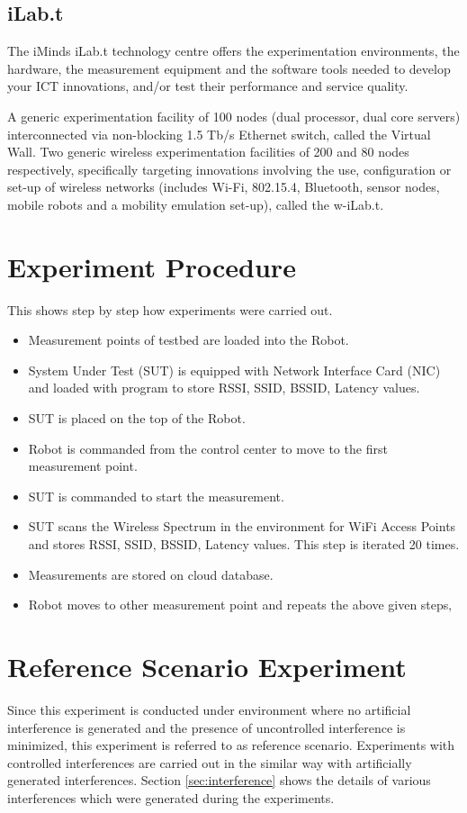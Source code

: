 \documentclass[11pt,a4paper,headinclude,footinclude,chapterprefix=on]{scrreprt}
\begin{document}
\subsection{iLab.t}
The iMinds iLab.t technology centre offers the experimentation environments, the hardware, the measurement equipment and the software tools needed to develop your ICT innovations, and/or test their performance and service quality.

A generic experimentation facility of 100 nodes (dual processor, dual core servers) interconnected via non-blocking 1.5 Tb/s Ethernet switch, called the Virtual Wall. Two generic wireless experimentation facilities of 200 and 80 nodes respectively, specifically targeting innovations involving the use, configuration or set-up of wireless networks (includes Wi-Fi, 802.15.4, Bluetooth, sensor nodes, mobile robots and a mobility emulation set-up), called the w-iLab.t.

\section{Experiment Procedure}
This shows step by step how experiments were carried out. 
\begin{itemize}
\item Measurement points of testbed are loaded into the Robot. 
\item System Under Test (SUT) is equipped with Network Interface Card (NIC) and loaded with program to store RSSI, SSID, BSSID, Latency values.
\item SUT is placed on the top of the Robot.
\item Robot is commanded from the control center to move to the first measurement point.
\item SUT is commanded to start the measurement.
\item SUT scans the Wireless Spectrum in the environment for WiFi Access Points and stores RSSI, SSID, BSSID, Latency values. This step is iterated 20 times.
\item Measurements are stored on cloud database.
\item Robot moves to other measurement point and repeats the above given steps‚
\end{itemize}

\section{Reference Scenario Experiment}
Since this experiment is conducted under environment where no artificial interference is generated and the presence of uncontrolled interference is minimized, this experiment is referred to as reference scenario. Experiments with controlled interferences are carried out in the similar way with artificially generated interferences. Section \ref{sec:interference} shows the details of various interferences which were generated during the experiments.
\end{document}
